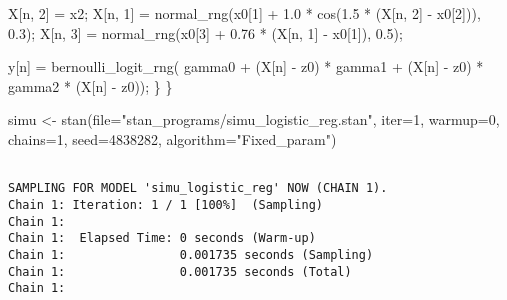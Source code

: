 \documentclass[
  letterpaper,
  DIV=11,
  numbers=noendperiod]{scrartcl}
\newenvironment{Shaded}{\begin{snugshade}}{\end{snugshade}}
\newcommand{\AttributeTok}[1]{\textcolor[rgb]{0.40,0.45,0.13}{#1}}
\newcommand{\DecValTok}[1]{\textcolor[rgb]{0.68,0.00,0.00}{#1}}
\newcommand{\FloatTok}[1]{\textcolor[rgb]{0.68,0.00,0.00}{#1}}
\newcommand{\FunctionTok}[1]{\textcolor[rgb]{0.28,0.35,0.67}{#1}}
\newcommand{\NormalTok}[1]{\textcolor[rgb]{0.00,0.23,0.31}{#1}}
\newcommand{\OtherTok}[1]{\textcolor[rgb]{0.00,0.23,0.31}{#1}}
\newcommand{\StringTok}[1]{\textcolor[rgb]{0.13,0.47,0.30}{#1}}
\begin{document}
\begin{codelisting}
\begin{Shaded}
\begin{Highlighting}[]
\NormalTok{    X[n, }\DecValTok{2}\NormalTok{] = x2;}
\NormalTok{    X[n, }\DecValTok{1}\NormalTok{] = normal\_rng(x0[}\DecValTok{1}\NormalTok{] + }\FloatTok{1.0}\NormalTok{ * cos(}\FloatTok{1.5}\NormalTok{ * (X[n, }\DecValTok{2}\NormalTok{] {-} x0[}\DecValTok{2}\NormalTok{])), }\FloatTok{0.3}\NormalTok{);}
\NormalTok{    X[n, }\DecValTok{3}\NormalTok{] = normal\_rng(x0[}\DecValTok{3}\NormalTok{] + }\FloatTok{0.76}\NormalTok{ * (X[n, }\DecValTok{1}\NormalTok{] {-} x0[}\DecValTok{1}\NormalTok{]), }\FloatTok{0.5}\NormalTok{);}

\NormalTok{    y[n] = bernoulli\_logit\_rng(  gamma0 }
\NormalTok{                               + (X[n] {-} z0\textquotesingle{}) * gamma1}
\NormalTok{                               + (X[n] {-} z0\textquotesingle{}) * gamma2 * (X[n] {-} z0\textquotesingle{})\textquotesingle{});}
\NormalTok{  \}}
\NormalTok{\}}
\end{Highlighting}
\end{Shaded}

\end{codelisting}

\begin{Shaded}
\begin{Highlighting}[]
\NormalTok{simu }\OtherTok{\textless{}{-}} \FunctionTok{stan}\NormalTok{(}\AttributeTok{file=}\StringTok{"stan\_programs/simu\_logistic\_reg.stan"}\NormalTok{,}
             \AttributeTok{iter=}\DecValTok{1}\NormalTok{, }\AttributeTok{warmup=}\DecValTok{0}\NormalTok{, }\AttributeTok{chains=}\DecValTok{1}\NormalTok{,}
             \AttributeTok{seed=}\DecValTok{4838282}\NormalTok{, }\AttributeTok{algorithm=}\StringTok{"Fixed\_param"}\NormalTok{)}
\end{Highlighting}
\end{Shaded}

\begin{verbatim}

SAMPLING FOR MODEL 'simu_logistic_reg' NOW (CHAIN 1).
Chain 1: Iteration: 1 / 1 [100%]  (Sampling)
Chain 1: 
Chain 1:  Elapsed Time: 0 seconds (Warm-up)
Chain 1:                0.001735 seconds (Sampling)
Chain 1:                0.001735 seconds (Total)
Chain 1: 
\end{verbatim}
\end{document}
